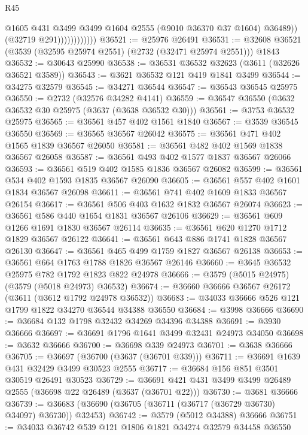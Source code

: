 \begin{lexlean}{R45}
\begin{coremodule}
                              @1605
                              @431
                              @3499
                              @3499
                              @1604
                              @2555
                              (@9010 @36370 @37 @1604)
                              @36489))
                          (@32719 @291))))))))))))
@36521 := @25976 @26491
@36531 := @32608 @36521 (@3539 (@32595 @25974 @2551) (@2732 (@32471 @25974 @2551))) @1843
@36532 := @30643 @25990
@36538 := @36531 @36532 @32623 (@3611 (@32626 @36521 @3589))
@36543 := @3621 @36532 @121 @419 @1841 @3499
@36544 := @34275 @32579
@36545 := @34271 @36544
@36547 := @36543 @36545 @25975
@36550 := @2732 (@32576 @34282 @4141)
@36559 := @36547 @36550 (@3632 @36532 @30 @25975 (@3637 (@3638 @36532 @30)))
@36561 := @3753 @36532 @25975
@36565 := @36561 @457 @402 @1561 @1840
@36567 := @3539 @36545 @36550
@36569 := @36565 @36567 @26042
@36575 := @36561 @471 @402 @1565 @1839 @36567 @26050
@36581 := @36561 @482 @402 @1569 @1838 @36567 @26058
@36587 := @36561 @493 @402 @1577 @1837 @36567 @26066
@36593 := @36561 @519 @402 @1585 @1836 @36567 @26082
@36599 := @36561 @534 @402 @1593 @1835 @36567 @26090
@36605 := @36561 @557 @402 @1601 @1834 @36567 @26098
@36611 := @36561 @741 @402 @1609 @1833 @36567 @26154
@36617 := @36561 @506 @403 @1632 @1832 @36567 @26074
@36623 := @36561 @586 @440 @1654 @1831 @36567 @26106
@36629 := @36561 @609 @1266 @1691 @1830 @36567 @26114
@36635 := @36561 @620 @1270 @1712 @1829 @36567 @26122
@36641 := @36561 @643 @886 @1741 @1828 @36567 @26130
@36647 := @36561 @465 @499 @1759 @1827 @36567 @26138
@36653 := @36561 @664 @1763 @1788 @1826 @36567 @26146
@36660 := @3645 @36532 @25975 @782 @1792 @1823 @822 @24978
@36666 := @3579 (@5015 @24975) (@3579 (@5018 @24973) @36532)
@36674 := @36660 @36666 @36567 @26172 (@3611 (@3612 @1792 @24978 @36532))
@36683 := @34033 @36666 @526 @121 @1799 @1822 @34270 @36544 @34388 @36550
@36684 := @3998 @36666
@36690 := @36684 @132 @1798 @32432 @34269 @34396 @34388
@36691 := @3930 @36666
@36697 := @36691 @1796 @1641 @3499 @32431 @24973 @34050
@36698 := @3632 @36666
@36700 := @36698 @339 @24973
@36701 := @3638 @36666
@36705 := @36697 (@36700 (@3637 (@36701 @339)))
@36711 := @36691 @1639 @431 @32429 @3499 @30523 @2555
@36717 := @36684 @156 @851 @3501 @30519 @26491 @30523
@36729 := @36691 @421 @431 @3499 @3499 @26489 @2555 (@36698 @22 @26489 (@3637 (@36701 @22)))
@36730 := @3681 @36666
@36739 := @36683 (@36690 (@36705 (@36711 (@36717 (@36729 @36730) @34097) @36730)) @32453)
@36742 := @3579 (@5012 @34388) @36666
@36751 := @34033 @36742 @539 @121 @1806 @1821 @34274 @32579 @34458 @36550

\end{coremodule}
\end{lexlean}
